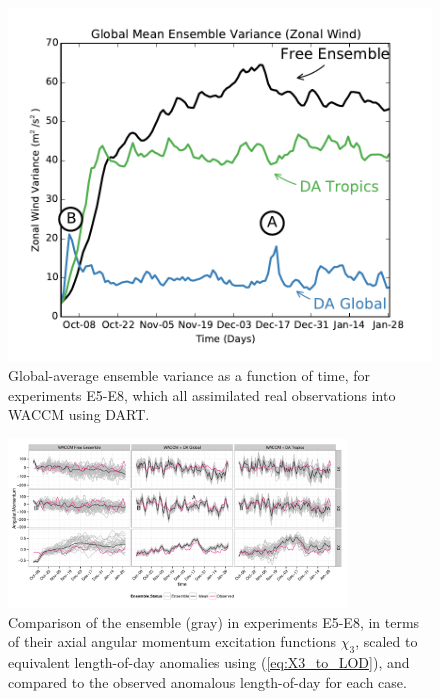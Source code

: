  \begin{figure}
	 \includegraphics[width=\textwidth]{Paper_figures/ERPDA_paper_evalvariable_state_space.pdf}
	 \caption{Global-average ensemble variance as a function of time, for experiments E5-E8, which all assimilated real observations into WACCM using DART.}
	 \label{fig:evalvariable_state}
\end{figure}



\begin{figure}
	 \includegraphics[width=0.8\textwidth]{Paper_figures/ERPDA_paper_evalvariable_aam_space.pdf}
	 \caption{Comparison of the ensemble (gray) in experiments E5-E8, in terms of their axial angular momentum excitation functions $\chi_3$, scaled to equivalent length-of-day anomalies using (\ref{eq:X3_to_LOD}), and compared to the observed anomalous length-of-day for each case.}
	 \label{fig:evalvariable_aam}
\end{figure}






